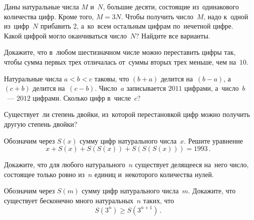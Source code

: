 \begin{problems}
\item
Даны натуральные числа $M$ и~$N$, большие десяти, состоящие из~одинакового
количества цифр.
Кроме того, $M = 3 N$.
Чтобы получить число~$M$, надо к~одной из~цифр~$N$ прибавить $2$, а~ко~всем
остальным цифрам по~нечетной цифре.
Какой цифрой могло оканчиваться число~$N$?
Найдите все варианты.

\item
Докажите, что в~любом шестизначном числе можно переставить цифры так, чтобы
сумма первых трех отличалась от~суммы вторых трех меньше, чем на~$10$.


\item
Натуральные числа $a < b < c$ таковы, что $(b + a)$ делится на~$(b - a)$,
а~$(c + b)$ делится на~$(c - b)$.
Число~$a$ записывается $2011$ цифрами, а~число~$b$~--- $2012$ цифрами.
Сколько цифр в~числе~$c$?

\item
Существует~ли степень двойки, из~которой перестановкой цифр можно получить
другую степень двойки?

\item
Обозначим через $S(x)$ сумму цифр натурального числа~$x$.
Решите уравнение
\[
    x + S(x) + S(S(x)) + S(S(S(x))) = 1993
\, . \]

\item
Докажите, что для любого натурального~$n$ существует делящееся на~него число,
состоящее только ровно из~$n$ единиц и~некоторого количества нулей.

\item
Обозначим через $S(m)$ сумму цифр натурального числа~$m$.
Докажите, что существует бесконечно много натуральных~$n$ таких, что
\[
    S(3^n) \geq S(3^{n+1})
\, . \]


\end{problems}

